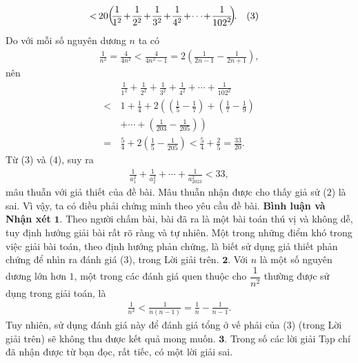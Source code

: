 \begin{multicols}{2}
\begin{align*}
		< \,&20\!\left(\!\!{\frac{1}{{{1^2}}} \!+\! \frac{1}{{{2^2}}} \!+\! \frac{1}{{{3^2}}} \!+\! \frac{1}{{{4^2}}} \!+\!  \cdots  \!+\! \frac{1}{{{{102}^2}}}}\!\! \right)\!\!. \quad{\color{black}(}3{\color{black})}
	\end{align*}
	Do với mỗi số nguyên dương $n$ ta có
	\begin{align*}
		\frac{1}{{{n^2}}} \!= \!\frac{4}{{4{n^2}}} \!<\! \frac{4}{{4{n^2} \!-\! 1}} \!=\! 2\!\left(\! {\frac{1}{{2n \!-\! 1}} \!-\! \frac{1}{{2n \!+\! 1}}} \!\right),
	\end{align*}
	nên
	\begin{align*}
		&\frac{1}{{{1^2}}} + \frac{1}{{{2^2}}} + \frac{1}{{{3^2}}} + \frac{1}{{{4^2}}} +  \cdots  + \frac{1}{{{{102}^2}}} \\
		< \,&1 + \frac{1}{4} + 2\left( \left( {\frac{1}{5} - \frac{1}{7}} \right) + \left( {\frac{1}{7} - \frac{1}{9}} \right) \right.\\
		&\left.+  \cdots  + \left( {\frac{1}{{203}} - \frac{1}{{205}}} \right) \right)\\
		= \,&\frac{5}{4} + 2\left( {\frac{1}{5} - \frac{1}{{205}}} \right) < \frac{5}{4} + \frac{2}{5} = \frac{{33}}{{20}}. \tag{$4$}
	\end{align*}
	Từ ($3$) và ($4$), suy ra
	\begin{align*}
		\frac{1}{{a_1^2}} + \frac{1}{{a_2^2}} +  \cdots  + \frac{1}{{a_{2023}^2}} < 33,
	\end{align*}
	mâu thuẫn với giả thiết của đề bài.
	\vskip 0.05cm
	Mâu thuẫn nhận được cho thấy giả sử ($2$) là sai. Vì vậy, ta có điều phải chứng minh theo yêu cầu đề bài.
	\vskip 0.05cm
	\textbf{\color{thachthuctoanhoc}Bình luận và Nhận xét}
	\vskip 0.05cm
	$\pmb{1.}$ Theo người chấm bài, bài đã ra là một bài toán thú vị và không dễ, tuy định hướng giải bài rất rõ ràng và tự nhiên. Một trong những điểm khó trong việc giải bài toán, theo định hướng phản chứng, là biết sử dụng giả thiết phản chứng để nhìn ra đánh giá ($3$), trong Lời giải trên.
	\vskip 0.05cm
	$\pmb{2.}$ Với $n$ là một số nguyên dương lớn hơn $1$, một trong các đánh giá quen thuộc cho $\dfrac{1}{n^2}$  thường được sử dụng trong giải toán, là
	\begin{align*}
		\frac{1}{{{n^2}}} < \frac{1}{{n\left( {n - 1} \right)}} = \frac{1}{n} - \frac{1}{{n - 1}}.
	\end{align*}
	Tuy nhiên, sử dụng đánh giá này để đánh giá tổng ở vế phải của ($3$) (trong Lời giải trên) sẽ không thu được kết quả mong muốn.
	\vskip 0.05cm
	$\pmb{3.}$ Trong số các lời giải Tạp chí đã nhận được từ bạn đọc, rất tiếc, có một lời giải sai.

\end{multicols}

